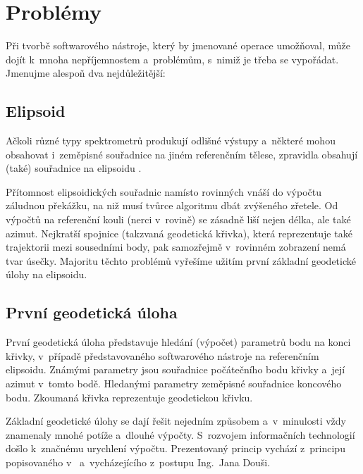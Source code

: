 \section{Problémy}
\label{problemy}

Při tvorbě softwarového nástroje, který by jmenované operace umožňoval, může dojít k~mnoha nepříjemnostem
a~problémům, s~nimiž je třeba se vypořádat. Jmenujme alespoň dva nejdůležitější: 

\subsection{Elipsoid}
\label{elipsoid}

Ačkoli různé typy spektrometrů produkují odlišné výstupy a~některé mohou obsahovat i~zeměpisné souřadnice
na jiném referenčním tělese, zpravidla obsahují (také) souřadnice na elipsoidu . 

Přítomnost elipsoidických souřadnic namísto rovinných vnáší do výpočtu záludnou překážku, na niž musí
tvůrce algoritmu dbát zvýšeného zřetele. Od výpočtů na referenční kouli (nerci v~rovině) se
zásadně liší nejen délka, ale také azimut. Nejkratší spojnice (takzvaná geodetická křivka), která
reprezentuje také trajektorii mezi sousedními body, pak samozřejmě
v~rovinném zobrazení nemá tvar úsečky. Majoritu těchto problémů vyřešíme užitím první základní
geodetické úlohy na elipsoidu. 

\subsection{První geodetická úloha}
\label{prvnigu}

První geodetická úloha představuje hledání (výpočet) parametrů bodu na konci křivky, v~případě
představovaného softwarového nástroje na referenčním elipsoidu. Zná\-mými parametry jsou souřadnice
počátečního bodu křivky a~její azimut v~tomto bodě. Hledanými parametry zeměpisné souřadnice koncového
bodu. Zkoumaná křivka reprezentuje geodetickou křivku. 

Základní geodetické úlohy se dají řešit nejedním způsobem a~v~minulosti vždy znamenaly mnohé potíže
a~dlouhé výpočty. S~rozvojem informačních technologií došlo k~značnému urychlení výpočtu.
Prezentovaný princip vychází z~principu popisovaného v~\cite{vyssigeodezie} a~vycházejícího
z~postupu Ing.~Jana Douši. 

